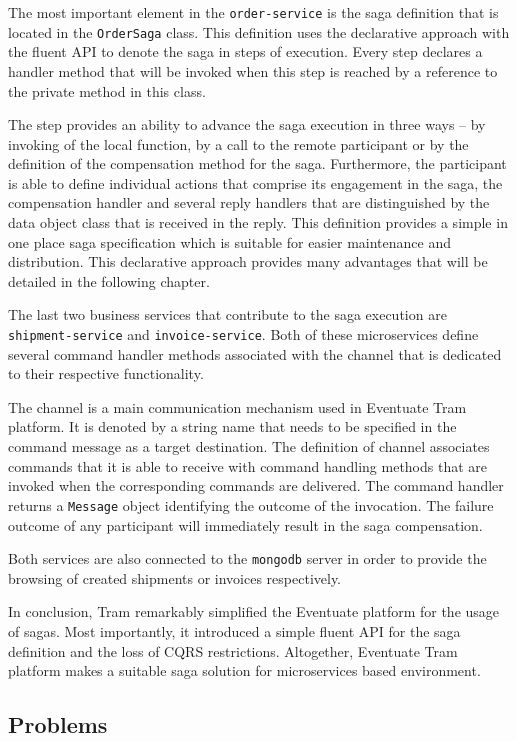 \documentclass[oneside,
  digital, %
  table,   %
  lof,     %
  lot,     %
]{fithesis3}
\begin{document}
The most important element in the \texttt{order-service} is the saga definition that is located in the \texttt{OrderSaga} class. This definition uses the declarative approach with the fluent API to denote the saga in steps of execution. Every step declares a handler method that will be invoked when this step is reached by a reference to the private method in this class.

The step provides an ability to advance the saga execution in three ways -- by invoking of the local function, by a call to the remote participant or by the definition of the compensation method for the saga. Furthermore, the participant is able to define individual actions that comprise its engagement in the saga, the compensation handler and several reply handlers that are distinguished by the data object class that is received in the reply. This definition provides a simple in one place saga specification which is suitable for easier maintenance and distribution. This declarative approach provides many advantages that will be detailed in the following chapter.

The last two business services that contribute to the saga execution are \texttt{shipment-service} and \texttt{invoice-service}. Both of these microservices define several command handler methods associated with the channel that is dedicated to their respective functionality. 

The channel is a main communication mechanism used in Eventuate Tram platform. It is denoted by a string name that needs to be specified in the command message as a target destination. The definition of channel associates commands that it is able to receive with command handling methods that are invoked when the corresponding commands are delivered. The command handler returns a \texttt{Message} object identifying the outcome of the invocation. The failure outcome of any participant will immediately result in the saga compensation.

Both services are also connected to the \texttt{mongodb} server in order to provide the browsing of created shipments or invoices respectively.

In conclusion, Tram remarkably simplified the Eventuate platform for the usage of sagas. Most importantly, it introduced a simple fluent API for the saga definition and the loss of CQRS restrictions. Altogether, Eventuate Tram platform makes a suitable saga solution for microservices based environment.

\subsection{Problems}
\end{document}
